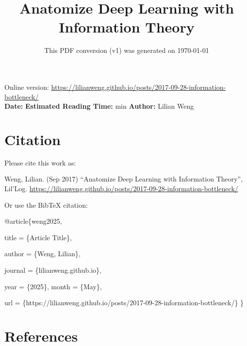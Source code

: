 \documentclass[12pt]{article}
\title{Anatomize Deep Learning with Information Theory}
\date{This PDF conversion (v1) was generated on \today\footnotemark}
\begin{document}
\maketitle
\begin{center}
    Online version: \url{https://lilianweng.github.io/posts/2017-09-28-information-bottleneck/} \\
    \textbf{Date:} \quad
    \textbf{Estimated Reading Time:}  min \quad
    \textbf{Author:} Lilian Weng
\end{center}




\newpage
\tableofcontents
\newpage
\vspace{1em}
\n\n\n\section{Citation}
Please cite this work as:

\begin{tcolorbox}[colback=black!5!white, colframe=black!80!white, boxrule=0.5pt, arc=2mm, left=1mm, right=1mm, top=1mm, bottom=1mm]
  Weng, Lilian. (Sep 2017) ``Anatomize Deep Learning with Information Theory'', Lil'Log. \url{https://lilianweng.github.io/posts/2017-09-28-information-bottleneck/}
  \end{tcolorbox}

Or use the BibTeX citation:

\begin{tcolorbox}[
    colback=black!5!white,
    colframe=black!80!white,
    boxrule=0.5pt,
    arc=2mm,
    left=1mm,
    right=1mm,
    top=1mm,
    bottom=1mm,
    listing only,
    listing options={
      basicstyle=\ttfamily\footnotesize,
      breaklines=true,
      literate={\{}{{\char`\{}}1 {\}}{{\char`\}}}1
    }
  ]
  @article\{weng2025,

    title   = \{Article Title\},

    author  = \{Weng, Lilian\},

    journal = \{lilianweng.github.io\},

    year    = \{2025\},
    month   = \{May\},

    url     = \{https://lilianweng.github.io/posts/2017-09-28-information-bottleneck/\}\n
  \}
  \end{tcolorbox}

\newpage
\section{References}

\n
\end{document}

